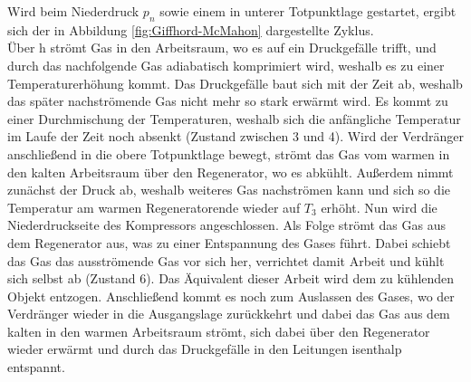 \documentclass[parskip=half, a4paper,twoside,final]{article}
\begin{document}
Wird beim Niederdruck $p_n$ sowie einem in unterer Totpunktlage gestartet, ergibt sich der in Abbildung \ref{fig:Giffhord-McMahon} dargestellte Zyklus. \\
Über h strömt Gas in den Arbeitsraum, wo es auf ein Druckgefälle trifft, und durch das nachfolgende Gas adiabatisch komprimiert wird, weshalb es zu einer Temperaturerhöhung kommt. Das Druckgefälle baut sich mit der Zeit ab, weshalb das später nachströmende Gas nicht mehr so stark erwärmt wird. Es kommt zu einer Durchmischung der Temperaturen, weshalb sich die anfängliche Temperatur im Laufe der Zeit noch absenkt (Zustand zwischen 3 und 4). Wird der Verdränger anschließend in die obere Totpunktlage bewegt, strömt das Gas vom warmen in den kalten Arbeitsraum  über den Regenerator, wo es abkühlt. Außerdem nimmt zunächst der Druck ab, weshalb weiteres Gas nachströmen kann und sich so die Temperatur am warmen Regeneratorende wieder auf $T_3$ erhöht. Nun wird die Niederdruckseite des Kompressors angeschlossen. Als Folge strömt das Gas aus dem Regenerator aus, was zu einer Entspannung des Gases führt. Dabei schiebt das Gas das ausströmende Gas vor sich her, verrichtet damit Arbeit und kühlt sich selbst ab (Zustand 6). Das Äquivalent dieser Arbeit wird dem zu kühlenden Objekt entzogen. Anschließend kommt es noch zum Auslassen des Gases, wo der Verdränger wieder in die Ausgangslage zurückkehrt und dabei das Gas aus dem kalten in den warmen Arbeitsraum strömt, sich dabei über den Regenerator wieder erwärmt und durch das Druckgefälle in den Leitungen isenthalp entspannt.
\end{document}
